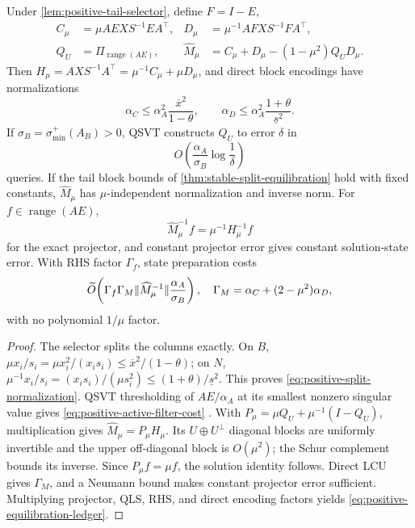 \begin{theorem}
\label{thm:positive-partition-free-equilibration}
Under \cref{lem:positive-tail-selector}, define $F=I-E$,
\begin{align}
 C_\mu&=\mu AEXS^{-1}EA^\top,&
 D_\mu&=\mu^{-1}AFXS^{-1}FA^\top,\nonumber\\
 Q_U&=\Pi_{\operatorname{range}(AE)},&
 \widehat M_\mu&=C_\mu+D_\mu-(1-\mu^2)Q_UD_\mu.        \label{eq:positive-constructive-split}
\end{align}
Then $H_\mu=AXS^{-1}A^\top=\mu^{-1}C_\mu+\mu D_\mu$, and direct block encodings
have normalizations
\begin{equation}
 \alpha_C\leq\alpha_A^2\frac{\overline x^2}{1-\theta},
 \qquad
 \alpha_D\leq\alpha_A^2\frac{1+\theta}{\underline s^2}. \label{eq:positive-split-normalization}
\end{equation}
If $\sigma_B=\sigma_{\min}^+(A_B)>0$, QSVT constructs $Q_U$ to error $\delta$
in
\begin{equation}
 O\!\left(\frac{\alpha_A}{\sigma_B}\log\frac{1}{\delta}\right) \label{eq:positive-active-filter-cost}
\end{equation}
queries.  If the tail block bounds of
\cref{thm:stable-split-equilibration} hold with fixed constants, $\widehat M_\mu$ has
$\mu$-independent normalization and inverse norm.  For $f\in\operatorname{range}(AE)$,
\begin{equation}
 \widehat M_\mu^{-1}f=\mu^{-1}H_\mu^{-1}f                 \label{eq:positive-state-identity}
\end{equation}
for the exact projector, and constant projector error gives constant
solution-state error.  With RHS factor $\Gamma_f$, state preparation costs
\begin{equation}
 \widetilde{O}\!\left(
 \Gamma_f\Gamma_M\lVert\widehat M_\mu^{-1}\rVert
 \frac{\alpha_A}{\sigma_B}\right),
 \quad \Gamma_M=\alpha_C+(2-\mu^2)\alpha_D,              \label{eq:positive-equilibration-ledger}
\end{equation}
with no polynomial $1/\mu$ factor.
\end{theorem}

\begin{proof}
The selector splits the columns exactly.  On $B$,
$\mu x_i/s_i=\mu x_i^2/(x_is_i)\leq\overline x^2/(1-\theta)$;
on $N$, $\mu^{-1}x_i/s_i=(x_is_i)/(\mu s_i^2)\leq
(1+\theta)/\underline s^2$.  This proves
\eqref{eq:positive-split-normalization}.  QSVT thresholding of $AE/\alpha_A$
at its smallest nonzero singular value gives
\eqref{eq:positive-active-filter-cost}
\cite{andras2019-quantum-singular-value-transformation-beyond}.
With $P_\mu=\mu Q_U+\mu^{-1}(I-Q_U)$, multiplication gives
$\widehat M_\mu=P_\mu H_\mu$.  Its $U\oplus U^\perp$ diagonal blocks are
uniformly invertible and the upper off-diagonal block is $O(\mu^2)$; the Schur
complement bounds its inverse.  Since $P_\mu f=\mu f$, the solution identity
follows.  Direct LCU gives $\Gamma_M$, and a Neumann bound makes constant
projector error sufficient.  Multiplying projector, QLS, RHS, and direct
encoding factors yields \eqref{eq:positive-equilibration-ledger}.
\end{proof}

